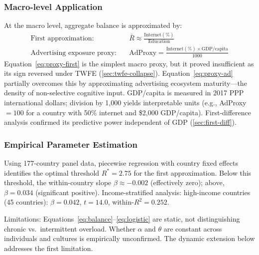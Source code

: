 \documentclass[a4paper,11pt,titlepage]{article}
\begin{document}
\subsubsection{Macro-level Application}

At the macro level, aggregate balance is approximated by:
\begin{align}
  \text{First approximation:}\quad & \bar{R} \approx \frac{\text{Internet}(\%)}{\text{Education}} \label{eq:proxy-first} \\[4pt]
  \text{Advertising exposure proxy:}\quad & \text{AdProxy} = \frac{\text{Internet}(\%) \times \text{GDP/capita}}{1000} \label{eq:proxy-ad}
\end{align}
Equation~\eqref{eq:proxy-first} is the simplest macro proxy, but it proved insufficient as its sign reversed under TWFE (\cref{sec:twfe-collapse}). Equation~\eqref{eq:proxy-ad} partially overcomes this by approximating advertising ecosystem maturity---the density of non-selective cognitive input. GDP/capita is measured in 2017 PPP international dollars; division by 1,000 yields interpretable units (e.g., AdProxy $= 100$ for a country with 50\% internet and \$2,000 GDP/capita). First-difference analysis confirmed its predictive power independent of GDP (\cref{sec:first-diff}).

\subsubsection{Empirical Parameter Estimation}

Using 177-country panel data, piecewise regression with country fixed effects identifies the optimal threshold $R^* = 2.75$ for the first approximation. Below this threshold, the within-country slope $\beta \approx -0.002$ (effectively zero); above, $\beta = 0.034$ (significant positive). Income-stratified analysis: high-income countries (45 countries): $\beta = 0.042$, $t = 14.0$, within-$R^2 = 0.252$.

Limitations: Equations~\eqref{eq:balance}--\eqref{eq:logistic} are static, not distinguishing chronic vs.\ intermittent overload. Whether $\alpha$ and $\theta$ are constant across individuals and cultures is empirically unconfirmed. The dynamic extension below addresses the first limitation.
\end{document}
